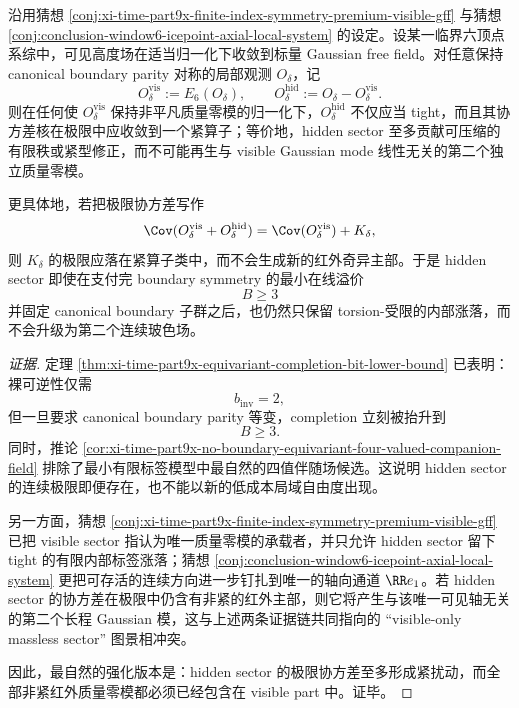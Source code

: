 \begin{conjecture}\label{conj:conclusion-window6-hidden-no-second-boson-compactness}
沿用猜想 \ref{conj:xi-time-part9x-finite-index-symmetry-premium-visible-gff} 与猜想 \ref{conj:conclusion-window6-icepoint-axial-local-system} 的设定。设某一临界六顶点系综中，可见高度场在适当归一化下收敛到标量 Gaussian free field。对任意保持 canonical boundary parity 对称的局部观测 \(O_\delta\)，记
\[
O_\delta^{\mathrm{vis}}:=E_6(O_\delta),
\qquad
O_\delta^{\mathrm{hid}}:=O_\delta-O_\delta^{\mathrm{vis}}.
\]
则在任何使 \(O_\delta^{\mathrm{vis}}\) 保持非平凡质量零模的归一化下，\(O_\delta^{\mathrm{hid}}\) 不仅应当 tight，而且其协方差核在极限中应收敛到一个紧算子；等价地，hidden sector 至多贡献可压缩的有限秩或紧型修正，而不可能再生与 visible Gaussian mode 线性无关的第二个独立质量零模。

更具体地，若把极限协方差写作
\[
\Cov(O_\delta^{\mathrm{vis}}+O_\delta^{\mathrm{hid}})
=
\Cov(O_\delta^{\mathrm{vis}})+K_\delta,
\]
则 \(K_\delta\) 的极限应落在紧算子类中，而不会生成新的红外奇异主部。于是 hidden sector 即使在支付完 boundary symmetry 的最小在线溢价
\[
B\ge 3
\]
并固定 canonical boundary 子群之后，也仍然只保留 torsion-受限的内部涨落，而不会升级为第二个连续玻色场。
\end{conjecture}
\begin{proof}[证据]
定理 \ref{thm:xi-time-part9x-equivariant-completion-bit-lower-bound} 已表明：裸可逆性仅需
\[
b_{\mathrm{inv}}=2,
\]
但一旦要求 canonical boundary parity 等变，completion 立刻被抬升到
\[
B\ge 3.
\]
同时，推论 \ref{cor:xi-time-part9x-no-boundary-equivariant-four-valued-companion-field} 排除了最小有限标签模型中最自然的四值伴随场候选。这说明 hidden sector 的连续极限即便存在，也不能以新的低成本局域自由度出现。

另一方面，猜想 \ref{conj:xi-time-part9x-finite-index-symmetry-premium-visible-gff} 已把 visible sector 指认为唯一质量零模的承载者，并只允许 hidden sector 留下 tight 的有限内部标签涨落；猜想 \ref{conj:conclusion-window6-icepoint-axial-local-system} 更把可存活的连续方向进一步钉扎到唯一的轴向通道 \(\RR e_1\)。若 hidden sector 的协方差在极限中仍含有非紧的红外主部，则它将产生与该唯一可见轴无关的第二个长程 Gaussian 模，这与上述两条证据链共同指向的 “visible-only massless sector” 图景相冲突。

因此，最自然的强化版本是：hidden sector 的极限协方差至多形成紧扰动，而全部非紧红外质量零模都必须已经包含在 visible part 中。证毕。
\end{proof}

